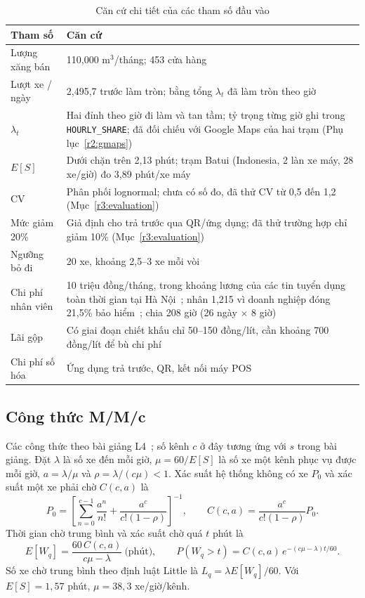 \begin{table}[H]\centering\small
\caption{Căn cứ chi tiết của các tham số đầu vào}\label{r2:assumptions-detail}
\begin{tabularx}{\linewidth}{@{}p{34mm}Y@{}}
\toprule
Tham số & Căn cứ \\
\midrule
Lượng xăng bán & 110,000 m$^3$/tháng; 453 cửa hàng~\cite{sct2026} \\
Lượt xe / ngày & 2,495,7 trước làm tròn; bằng tổng $\lambda_t$ đã làm tròn theo giờ \\
$\lambda_t$ & Hai đỉnh theo giờ đi làm và tan tầm; tỷ trọng từng giờ ghi trong \texttt{HOURLY\_SHARE}; đã đối chiếu với Google Maps của hai trạm (Phụ lục~\ref{r2:gmaps}) \\
$E[S]$ & Dưới chặn trên 2,13 phút; trạm Batui (Indonesia, 2 làn xe máy, 28 xe/giờ) đo 3,89 phút/xe máy~\cite{batui} \\
CV & Phân phối lognormal; chưa có số đo, đã thử CV từ 0,5 đến 1,2 (Mục~\ref{r3:evaluation}) \\
Mức giảm 20\% & Giả định cho trả trước qua QR/ứng dụng; đã thử trường hợp chỉ giảm 10\% (Mục~\ref{r3:evaluation}) \\
Ngưỡng bỏ đi & 20 xe, khoảng 2,5--3 xe mỗi vòi \\
Chi phí nhân viên & 10 triệu đồng/tháng, trong khoảng lương của các tin tuyển dụng toàn thời gian tại Hà Nội~\cite{wageMB,wageHFC}; nhân 1,215 vì doanh nghiệp đóng 21,5\% bảo hiểm~\cite{bhxh2026}; chia 208 giờ (26 ngày $\times$ 8 giờ) \\
Lãi gộp & Có giai đoạn chiết khấu chỉ 50--150 đồng/lít, cần khoảng 700 đồng/lít để bù chi phí~\cite{chietkhau} \\
Chi phí số hóa & Ứng dụng trả trước, QR, kết nối máy POS \\
\bottomrule
\end{tabularx}
\end{table}

\subsection{Công thức M/M/c}
\label{r2:app-formula}
\noindent
Các công thức theo bài giảng L4~\cite[slide~22--23, 49--50, 55]{l4}; số kênh
$c$ ở đây tương ứng với $s$ trong bài giảng. Đặt
$\lambda$ là số xe đến mỗi giờ, $\mu=60/E[S]$ là số xe một kênh phục vụ được
mỗi giờ, $a=\lambda/\mu$ và $\rho=\lambda/(c\mu)<1$. Xác suất hệ thống không có
xe $P_0$ và xác suất một xe phải chờ $C(c,a)$ là
\begin{equation}
 P_0=\left[\sum_{n=0}^{c-1}\frac{a^n}{n!}+\frac{a^c}{c!(1-\rho)}\right]^{-1},\qquad
 C(c,a)=\frac{a^c}{c!(1-\rho)}P_0.
\end{equation}
Thời gian chờ trung bình và xác suất chờ quá $t$ phút là
\begin{equation}
 E[W_q]=\frac{60\,C(c,a)}{c\mu-\lambda}\ \text{(phút)},\qquad
 P(W_q>t)=C(c,a)\,e^{-(c\mu-\lambda)t/60}.
\end{equation}
Số xe chờ trung bình theo định luật Little là $L_q=\lambda E[W_q]/60$. Với
$E[S]=1{,}57$ phút, $\mu=38{,}3$ xe/giờ/kênh.

